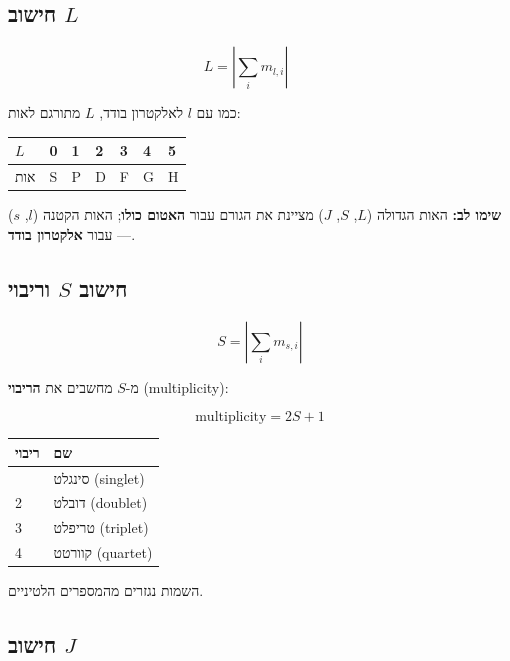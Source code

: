 \documentclass[
  hebrew,
  letterpaper,
  DIV=11,
  numbers=noendperiod]{scrreprt}
\newcounter{none} %
\begin{document}
\subsection{\texorpdfstring{חישוב
\(L\)}{חישוב L}}\label{ux5d7ux5d9ux5e9ux5d5ux5d1-l}

\[L = \left|\sum_i m_{l,i}\right| \qquad\]

כמו עם \(l\) לאלקטרון בודד, \(L\) מתורגם לאות:

{\def\LTcaptype{none} %
\begin{longtable}[]{@{}lllllll@{}}
\toprule\noalign{}
\(L\) & 0 & 1 & 2 & 3 & 4 & 5 \\
\midrule\noalign{}
\endhead
\bottomrule\noalign{}
\endlastfoot
אות & S & P & D & F & G & H \\
\end{longtable}
}

\textbf{שימו לב:} האות הגדולה (\(L\), \(S\), \(J\)) מציינת את הגורם עבור
\textbf{האטום כולו}; האות הקטנה (\(l\), \(s\)) --- עבור \textbf{אלקטרון
בודד}.

\subsection{\texorpdfstring{חישוב \(S\)
וריבוי}{חישוב S וריבוי}}\label{ux5d7ux5d9ux5e9ux5d5ux5d1-s-ux5d5ux5e8ux5d9ux5d1ux5d5ux5d9}

\[S = \left|\sum_i m_{s,i}\right|\]

מ-\(S\) מחשבים את \textbf{הריבוי} (multiplicity):

\[\text{multiplicity} = 2S + 1\]

{\def\LTcaptype{none} %
\begin{longtable}[]{@{}ll@{}}
\toprule\noalign{}
ריבוי & שם \\
\midrule\noalign{}
\endhead
\bottomrule\noalign{}
\endlastfoot
1 & סינגלט (singlet) \\
2 & דובלט (doublet) \\
3 & טריפלט (triplet) \\
4 & קוורטט (quartet) \\
\end{longtable}
}

השמות נגזרים מהמספרים הלטיניים.

\subsection{\texorpdfstring{חישוב
\(J\)}{חישוב J}}\label{ux5d7ux5d9ux5e9ux5d5ux5d1-j}
\end{document}
